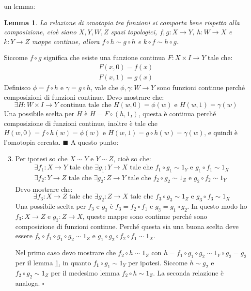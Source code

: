 \documentclass[10pt]{scrartcl}
\newtheorem{lemma}[section]{Lemma}
\newenvironment{proof}{{\textbf{Dimostrazione}:}}{\hfill $\blacksquare$}
\begin{document}
un lemma:
\begin{lemma}
  \label{lemma:composizione_funzioni_omotopia}
  La relazione di omotopia tra funzioni si comporta bene
  rispetto alla composizione, cioè siano $ X, Y, W, Z $
  spazi topologici, $ f, g \colon X \to Y $,
  $ h \colon W \to X $ e $ k \colon Y \to Z $ mappe continue,
  allora $ f \circ h \sim g \circ h $ e $ k \circ f \sim h \circ g $.
\end{lemma}
\begin{proof}
  Siccome $ f \circ g $ significa che esiste una funzione
  continua $ F \colon X \times I \to Y $ tale che:
  \begin{align*}
    F(x, 0) = f(x) \\
    F(x, 1) = g(x)
  \end{align*}
  Definisco $ \phi = f \circ h $ e $ \gamma = g \circ h $, vale che
  $ \phi, \gamma \colon W \to Y $ sono funzioni continue perché
  composizioni di funzioni continue. Devo mostrare che:
  \[
    \exists H \colon W \times I \to Y \text{ continua tale che }
    H(w, 0) = \phi(w) \text{ e } H(w, 1) = \gamma(w)
  \]
  Una possibile scelta per $ H $ è $ H = F \circ (h, 1_I) $,
  questa è continua perché composizione di funzioni
  continue, inoltre è tale che $ H(w, 0) = f \circ h (w) = \phi(w) $
  e $ H(w, 1) = g \circ h (w) = \gamma(w) $, e quindi è l'omotopia
  cercata.
\end{proof}
\newline\newline
A questo punto:
\begin{enumerate}
  \setcounter{enumi}{2}
\item Per ipotesi so che $ X \sim Y $ e $ Y \sim Z $, cioè
  so che:
  \begin{gather*}
    \exists f_1 \colon X \to Y \text{ tale che } \exists g_1 \colon Y \to X \text{ tale che }
    f_1 \circ g_1 \sim 1_Y \text{ e } g_1 \circ f_1 \sim 1_X \\
    \exists f_2 \colon Y \to Z \text{ tale che } \exists g_2 \colon Z \to Y \text{ tale che }
    f_2 \circ g_2 \sim 1_Z \text{ e } g_2 \circ f_2 \sim 1_Y
  \end{gather*}
  Devo mostrare che:
  \[
    \exists f_3 \colon X \to Z \text{ tale che } \exists g_2 \colon Z \to X \text{ tale che }
    f_3 \circ g_3 \sim 1_Z \text{ e } g_3 \circ f_3 \sim 1_X
  \]
  Una possibile scelta per $ f_3 $ e $ g_3 $ è $ f_3 = f_2 \circ f_1 $
  e $ g_3 = g_1 \circ g_2 $. In questo modo ho
  $ f_3 \colon X \to Z $ e $ g_3 \colon Z \to X $, queste
  mappe sono continue perché sono composizione
  di funzioni continue.
  Perché questa sia una buona scelta deve essere
  $ f_2 \circ f_1 \circ g_1 \circ g_2 \sim 1_Z $
  e  $  g_1 \circ g_2 \circ f_2 \circ f_1 \sim 1_X $.

  Nel primo caso devo mostrare che $ f_2 \circ h \sim 1_Z $ con
  $ h = f_1 \circ g_1 \circ g_2 \sim 1_Y \circ g_2 = g_2 $ per il lemma
  \ref{lemma:composizione_funzioni_omotopia}, in quanto $ f_1 \circ g_1 \sim 1_Y $
  per ipotesi. Siccome $ h \sim g_2 $ e $ f_2 \circ g_2 \sim 1_Z $ per il medesimo
  lemma $ f_2 \circ h \sim 1_Z $. La seconda relazione è analoga.
\hfill $ \square $
\end{enumerate}
\end{document}
